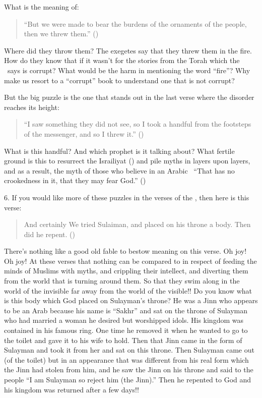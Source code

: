 \documentclass[12pt]{memoir}
\begin{document}
What is the meaning of:

\begin{quote}
“But we were made to bear the burdens of the ornaments of the people,
then we threw them.” ()
\end{quote}

Where did they throw them?
The exegetes say that they threw them in the fire.
How do they know that if it wasn’t for the stories
from the Torah which the \Quran\ says is corrupt?
What would be the harm in mentioning the word “fire”?
Why make us resort to a “corrupt” book
to understand one that is not corrupt?

But the big puzzle is the one that stands out in the last verse
where the disorder reaches its height:

\begin{quote}
“I saw something they did not see, so I took a handful
from the footsteps of the messenger, and so I threw it.”
()
\end{quote}

What is this handful? And which prophet is it talking about?
What fertile ground is this to resurrect the Isra\´iliyat
()
and pile myths in layers upon layers, and as a result,
the myth of those who believe in an Arabic \Quran\
“That has no crookedness in it, that they may fear God.”
()

6. If you would like more of these puzzles in the verses of the \Quran,
then here is this verse:

\begin{quote}
And certainly We tried Sulaiman, and placed on his throne a body.
Then did he repent. (\QRef{38:34})
\end{quote}

There’s nothing like a good old fable to bestow meaning on this verse.
Oh joy! Oh joy!
At these verses that nothing can be compared to in respect
of feeding the minds of Muslims with myths, and crippling their intellect,
and diverting them from the world that is turning around them.
So that they swim along in the world of the invisible far away from
the world of the visible!!
Do you know what is this body which God placed on Sulayman’s throne?
He was a Jinn who appears to be an Arab because his name is “Sakhr”
and sat on the throne of Sulayman who had married a woman
he desired but worshipped idols.
His kingdom was contained in his famous ring.
One time he removed it when he wanted to go to the toilet
and gave it to his wife to hold.
Then that Jinn came in the form of Sulayman and took it from her
and sat on this throne.
Then Sulayman came out (of the toilet) but in an appearance
that was different from his real form which the Jinn had stolen from him,
and he saw the Jinn on his throne and said to the people
“I am Sulayman so reject him (the Jinn).”
Then he repented to God and his kingdom was returned after a few days!!
\end{document}
